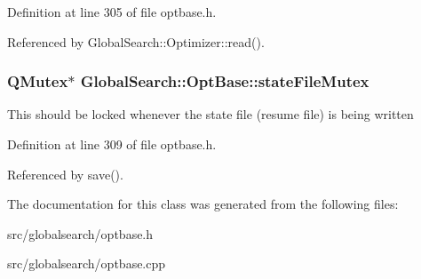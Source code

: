 Definition at line 305 of file optbase.\-h.



Referenced by Global\-Search\-::\-Optimizer\-::read().

\hypertarget{classGlobalSearch_1_1OptBase_af0df28a179c8a89022f4887c18761956}{
\subsubsection[{state\-File\-Mutex}]{\setlength{\rightskip}{0pt plus 5cm}Q\-Mutex$\ast$ Global\-Search\-::\-Opt\-Base\-::state\-File\-Mutex}}\label{classGlobalSearch_1_1OptBase_af0df28a179c8a89022f4887c18761956}
This should be locked whenever the state file (resume file) is being written 

Definition at line 309 of file optbase.\-h.



Referenced by save().



The documentation for this class was generated from the following files\-:\begin{DoxyCompactItemize}
\item 
src/globalsearch/optbase.\-h\item 
src/globalsearch/optbase.\-cpp\end{DoxyCompactItemize}
